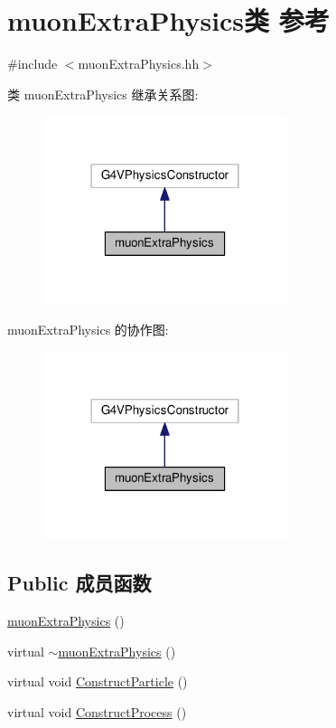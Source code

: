 \hypertarget{classmuonExtraPhysics}{}\section{muon\+Extra\+Physics类 参考}
\label{classmuonExtraPhysics}


{\ttfamily \#include $<$muon\+Extra\+Physics.\+hh$>$}



类 muon\+Extra\+Physics 继承关系图\+:\nopagebreak
\begin{figure}[H]
\begin{center}
\leavevmode
\includegraphics[width=202pt]{classmuonExtraPhysics__inherit__graph}
\end{center}
\end{figure}


muon\+Extra\+Physics 的协作图\+:\nopagebreak
\begin{figure}[H]
\begin{center}
\leavevmode
\includegraphics[width=202pt]{classmuonExtraPhysics__coll__graph}
\end{center}
\end{figure}
\subsection*{Public 成员函数}
\begin{DoxyCompactItemize}
\item 
\hyperlink{classmuonExtraPhysics_aa00c5ff2b117094696c8874cb8f02605}{muon\+Extra\+Physics} ()
\item 
virtual \hyperlink{classmuonExtraPhysics_a86e3250db873ce144cc70b0f27e95bb7}{$\sim$muon\+Extra\+Physics} ()
\item 
virtual void \hyperlink{classmuonExtraPhysics_a499780469ca3774cc90f6a73bc750f1e}{Construct\+Particle} ()
\item 
virtual void \hyperlink{classmuonExtraPhysics_acd8e6a94a2520746e6ae7cf342b83db5}{Construct\+Process} ()
\end{DoxyCompactItemize}


